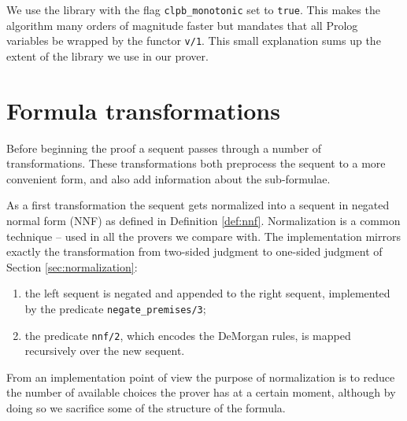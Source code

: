 We use the library with the flag \texttt{clpb\_monotonic} set to \texttt{true}.
This makes the algorithm many orders of magnitude faster but mandates that all Prolog variables be wrapped by the functor \texttt{v/1}.
This small explanation sums up the extent of the library we use in our prover.

\section{Formula transformations}
Before beginning the proof a sequent passes through a number of transformations.
These transformations both preprocess the sequent to a more convenient form, and also add information about the sub-formulae.

As a first transformation the sequent gets normalized into a sequent in negated normal form (NNF) as defined in Definition \ref{def:nnf}.
Normalization is a common technique -- used in all the provers we compare with.
The implementation mirrors exactly the transformation from two-sided judgment to one-sided judgment of Section \ref{sec:normalization}:
\begin{enumerate}
	\item the left sequent is negated and appended to the right sequent, implemented by the predicate \texttt{negate\_premises/3};
	\item the predicate \texttt{nnf/2}, which encodes the DeMorgan rules, is mapped recursively over the new sequent.
\end{enumerate}
From an implementation point of view the purpose of normalization is to reduce the number of available choices the prover has at a certain moment, although by doing so we sacrifice some of the structure of the formula.

